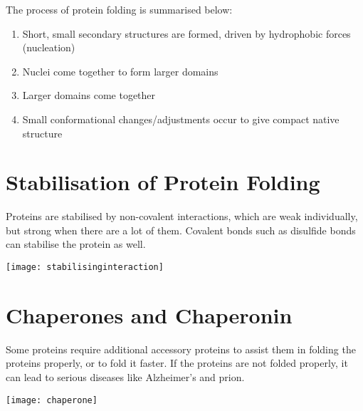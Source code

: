 \vspace{0.5cm}

\noindent
The process of protein folding is summarised below:
\begin{enumerate}
\item Short, small secondary structures are formed, driven by hydrophobic forces (nucleation)
\item Nuclei come together to form larger domains
\item Larger domains come together
\item Small conformational changes/adjustments occur to give compact native structure
\end{enumerate}

\section{Stabilisation of Protein Folding}

Proteins are stabilised by non-covalent interactions, which are weak individually, but strong when there are a lot of them.
Covalent bonds such as disulfide bonds can stabilise the protein as well.

\texttt{[image: stabilisinginteraction]}

\section{Chaperones and Chaperonin}

Some proteins require additional accessory proteins to assist them in folding the proteins properly, or to fold it faster.
If the proteins are not folded properly, it can lead to serious diseases like Alzheimer's and prion.

\begin{center}
\texttt{[image: chaperone]}
\end{center}
